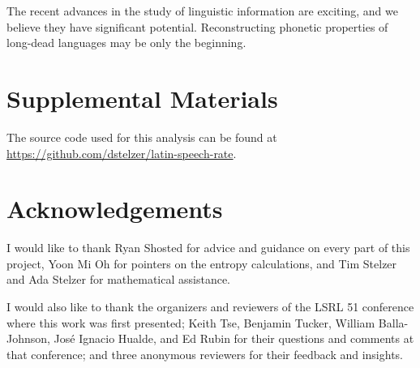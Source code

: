 \documentclass[12pt,twoside]{article}
\begin{document}
The recent advances in the study of linguistic information are exciting, and we believe they have significant potential. Reconstructing phonetic properties of long-dead languages may be only the beginning.

\section*{Supplemental Materials}

The source code used for this analysis can be found at \url{https://github.com/dstelzer/latin-speech-rate}.

\section*{Acknowledgements}

I would like to thank Ryan Shosted for advice and guidance on every part of this project, Yoon Mi Oh for pointers on the entropy calculations, and Tim Stelzer and Ada Stelzer for mathematical assistance.

I would also like to thank the organizers and reviewers of the LSRL 51 conference where this work was first presented; Keith Tse, Benjamin Tucker, William Balla-Johnson, José Ignacio Hualde, and Ed Rubin for their questions and comments at that conference; and three anonymous reviewers for their feedback and insights.

\label{sec:refs}
\setlength{}
\printbibliography
\end{document}
